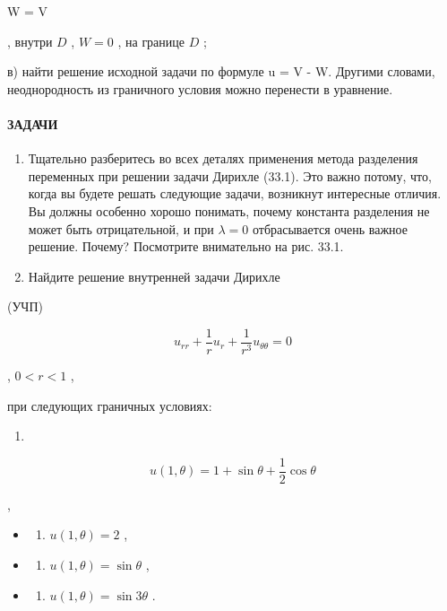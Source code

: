 \documentclass[
  ukrainian,
]{article}
\providecommand{\tightlist}{%
  \setlength{\itemsep}{0pt}\setlength{\parskip}{0pt}}
\begin{document}
\Delta W = \Delta V

, внутри \(D\) , \(W = 0\) , на границе \(D\) ;

в) найти решение исходной задачи по формуле u = V - W. Другими словами,
неоднородность из граничного условия можно перенести в уравнение.

\paragraph{ЗАДАЧИ}\label{ux437ux430ux434ux430ux447ux438-8}

\begin{enumerate}
\def\labelenumi{\arabic{enumi}.}
\item
  Тщательно разберитесь во всех деталях применения метода разделения
  переменных при решении задачи Дирихле (33.1). Это важно потому, что,
  когда вы будете решать следующие задачи, возникнут интересные отличия.
  Вы должны особенно хорошо понимать, почему константа разделения не
  может быть отрицательной, и при \(\lambda=0\) отбрасывается очень
  важное решение. Почему? Посмотрите внимательно на рис. 33.1.
\item
  Найдите решение внутренней задачи Дирихле
\end{enumerate}

(УЧП)

\[
u_{rr} + \frac{1}{r} u_r + \frac{1}{r^3} u_{\theta\theta} = 0
\]

, \(0 < r < 1\) ,

при следующих граничных условиях:

\begin{enumerate}
\def\labelenumi{\alph{enumi})}
\tightlist
\item
\end{enumerate}

\[
u(1, \theta) = 1 + \sin \theta + \frac{1}{2} \cos \theta
\]

,

\begin{itemize}
\tightlist
\item
  \begin{enumerate}
  \def\labelenumi{\arabic{enumi})}
  \setcounter{enumi}{5}
  \tightlist
  \item
    \(u(1, \theta) = 2\) ,
  \end{enumerate}
\item
  \begin{enumerate}
  \def\labelenumi{\Alph{enumi})}
  \setcounter{enumi}{1}
  \tightlist
  \item
    \(u(1, \theta) = \sin \theta\) ,
  \end{enumerate}
\item
  \begin{enumerate}
  \def\labelenumi{\alph{enumi})}
  \setcounter{enumi}{17}
  \tightlist
  \item
    \(u(1, \theta) = \sin 3\theta\) .
  \end{enumerate}
\end{itemize}
\end{document}
